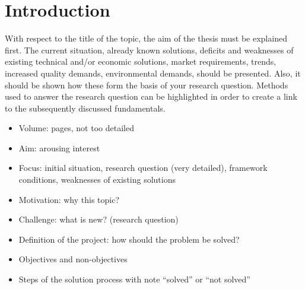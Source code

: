 \chapter{Introduction}
With respect to the title of the topic, the aim of the thesis must be explained first. The current situation, already known solutions, deficits and weaknesses of existing technical and/or economic solutions, market requirements, trends, increased quality demands, environmental demands, \etc should be presented. Also, it should be shown how these form the basis of your research question. Methods used to answer the research question can be highlighted in order to create a link to the subsequently discussed fundamentals.
\begin{itemize}
	\item Volume:  pages, not too detailed
	\item Aim: arousing interest
	\item Focus: initial situation, research question (very detailed), framework conditions, weaknesses of existing solutions
	\item Motivation: why this topic?
	\item Challenge: what is new? (research question)
	\item Definition of the project: how should the problem be solved?
	\item Objectives and non-objectives
	\item Steps of the solution process with note ``solved'' or ``not solved''
\end{itemize}